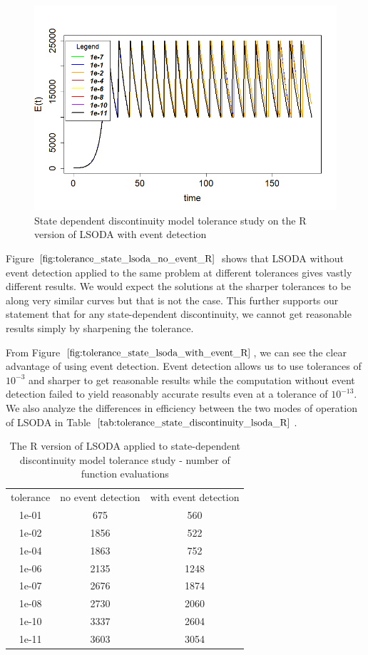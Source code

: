\begin{figure}[h]
\centering
\includegraphics[width=0.7\linewidth]{./figures/tolerance_state_lsoda_with_event_R}
\caption{State dependent discontinuity model tolerance study on the R version of LSODA with event detection}
\label{fig:tolerance_state_lsoda_with_event_R}
\end{figure}

Figure $\ref{fig:tolerance_state_lsoda_no_event_R}$ shows that LSODA without event detection applied to the same problem at different tolerances gives vastly different results. We would expect the solutions at the sharper tolerances to be along very similar curves but that is not the case. This further supports our statement that for any state-dependent discontinuity, we cannot get reasonable results simply by sharpening the tolerance.

From Figure $\ref{fig:tolerance_state_lsoda_with_event_R}$, we can see the clear advantage of using event detection. Event detection allows us to use tolerances of $10^{-3}$ and sharper to get reasonable results while the computation without event detection failed to yield reasonably accurate results even at a tolerance of $10^{-13}$. We also analyze the differences in efficiency between the two modes of operation of LSODA in Table $\ref{tab:tolerance_state_discontinuity_lsoda_R}$.

\begin{table}[h]
\caption {The R version of LSODA applied to state-dependent discontinuity model tolerance study - number of function evaluations} \label{tab:tolerance_state_discontinuity_lsoda_R} 
\begin{center}
\begin{tabular}{ c c c }
tolerance & no event detection & with event detection \\
1e-01 & 675 & 560 \\
1e-02 & 1856 & 522 \\
1e-04 & 1863 & 752 \\
1e-06 & 2135 & 1248 \\
1e-07 & 2676 & 1874 \\
1e-08 & 2730 & 2060 \\
1e-10 & 3337 & 2604 \\
1e-11 & 3603 & 3054 \\
\end{tabular}
\end{center}
\end{table}

